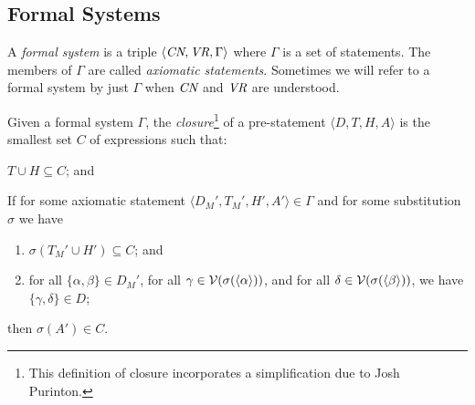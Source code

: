 \subsection{Formal Systems}

A {\em formal system} is a
triple $\langle \mbox{\em CN},\mbox{\em
VR},\Gamma\rangle$ where $\Gamma$ is a set of statements.  The members of
$\Gamma$ are called {\em axiomatic statements}.  Sometimes we will refer to a
formal system by just $\Gamma$ when $\mbox{\em CN}$ and $\mbox{\em VR}$ are
understood.

Given a formal system $\Gamma$, the {\em closure}\footnote{This
definition of closure incorporates a simplification due to
Josh Purinton.} of a
pre-statement
$\langle D,T,H,A \rangle$ is the smallest set $C$ of expressions
such that:
\begin{list}{}{\itemsep 0.0pt}
  \item[1.] $T\cup H\subseteq C$; and
  \item[2.] If for some axiomatic statement
    $\langle D_M',T_M',H',A' \rangle \in
       \Gamma$ and for some substitution
    $\sigma$ we have
    \begin{enumerate}
       \item[a.] $\sigma(T_M' \cup H') \subseteq C$; and
       \item[b.] for all $\{\alpha,\beta\}\in D_M'$, for all $\gamma\in
         {\cal V}(\sigma(\langle \alpha
         \rangle))$, and for all $\delta\in  {\cal V}(\sigma(\langle \beta
         \rangle))$, we have $\{\gamma, \delta\} \in D$;
   \end{enumerate}
   then $\sigma(A') \in C$.
\end{list}
